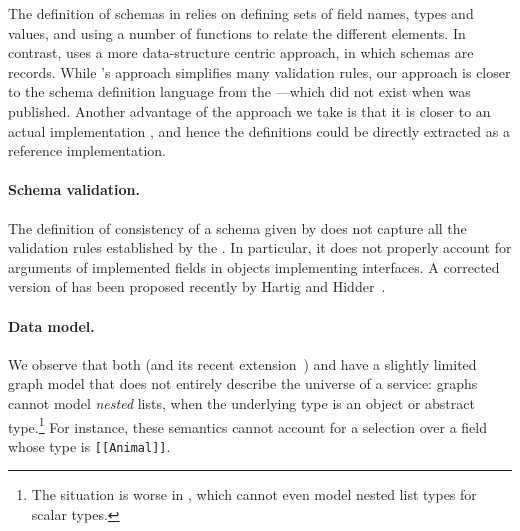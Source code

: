 The definition of schemas in \HP relies on defining sets of field names, types and values, and using a number of functions to relate the different elements. In contrast, \gcoql uses a more data-structure centric approach, in which schemas are records.
While \HP's approach simplifies many validation rules, our approach is closer to the schema definition language from the \spec---which did not exist when \HP was published. Another advantage of the approach we take is that it is closer to an actual implementation , and hence the definitions could be directly extracted as a reference implementation.

\paragraph{Schema validation.} The definition of consistency of a schema given by \HP does not capture all the validation rules established by the \spec. In particular, it does not properly account for arguments of implemented fields in objects implementing interfaces. A corrected version of \HP has been proposed recently by Hartig and Hidder~\cite{olafschema}. 


\paragraph{Data model.} We observe that both \HP (and its recent extension~\cite{olafschema}) and \gcoql have a slightly limited graph model that does not entirely describe the universe of a \gql service: graphs cannot model {\em nested} lists, when the underlying type is an object or abstract type.\footnote{The situation is worse in \HP, which cannot even model nested list types for scalar types.}
For instance, these semantics cannot account for a selection over a field whose type is \texttt{[[Animal]]}.

